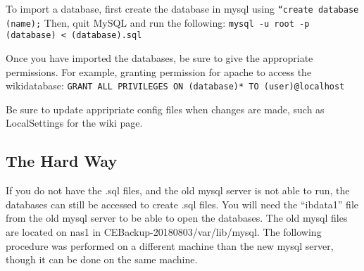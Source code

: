 \documentclass[12pt]{article}
\begin{document}
To import a database, first create the database in mysql using {\tt ``create database (name);} Then, quit MySQL and run the following: 
    {\tt mysql -u root -p (database) < (database).sql}    

Once you have imported the databases, be sure to give the appropriate permissions. For example, granting permission for apache to access the wikidatabase:
    {\tt GRANT ALL PRIVILEGES ON (database)* TO (user)@localhost}

Be sure to update appripriate config files when changes are made, such as LocalSettings for the wiki page. 

\subsection{The Hard Way}
If you do not have the .sql files, and the old mysql server is not able to run, the databases can still be accessed to create .sql files. You will need the ``ibdata1'' file from the old mysql server to be able to open the databases. The old mysql files are located on nas1 in CEBackup-20180803/var/lib/mysql. 
The following procedure was performed on a different machine than the new mysql server, though it can be done on the same machine.
\end{document}
